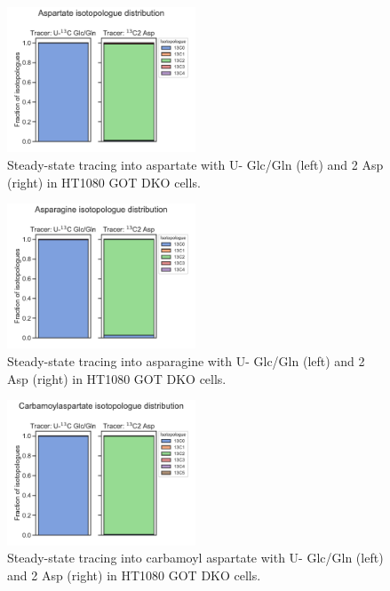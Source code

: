 \begin{figure}[ht]
    \centering
    \includegraphics[width=0.5\textwidth]{figures/sapp/DKO_char/HT1080_Asp_iso_dist.pdf}
    \caption[\hCi{} Gln/Glc, Asp tracing in HT1080 GOT DKO, Asp.]{
    Steady-state tracing into aspartate with U-\hCi{} Glc/Gln (left) and \hCi{}2 Asp (right) in HT1080 GOT DKO cells.
    }
    \label{fig:sapp:DKO_char:HT1080_Asp_iso_dist}
\end{figure}

\begin{figure}[ht]
    \centering
    \includegraphics[width=0.5\textwidth]{figures/sapp/DKO_char/HT1080_Asn_iso_dist.pdf}
    \caption[\hCi{} Gln/Glc, Asp tracing in HT1080 GOT DKO, Asn.]{
    Steady-state tracing into asparagine with U-\hCi{} Glc/Gln (left) and \hCi{}2 Asp (right) in HT1080 GOT DKO cells.
    }
    \label{fig:sapp:DKO_char:HT1080_Asn_iso_dist}
\end{figure}

\begin{figure}[ht]
    \centering
    \includegraphics[width=0.5\textwidth]{figures/sapp/DKO_char/HT1080_CarbAsp_iso_dist.pdf}
    \caption[\hCi{} Gln/Glc, Asp tracing in HT1080 GOT DKO, Carbamoyl Asp.]{
    Steady-state tracing into carbamoyl aspartate with U-\hCi{} Glc/Gln (left) and \hCi{}2 Asp (right) in HT1080 GOT DKO cells.
    }
    \label{fig:sapp:DKO_char:HT1080_CarbAsp_iso_dist}
\end{figure}

